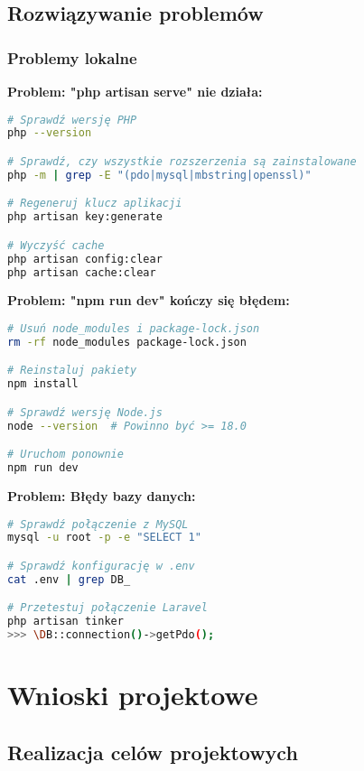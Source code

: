 \documentclass[12pt,a4paper]{article}
\begin{document}
    \subsection{Rozwiązywanie problemów}

    \subsubsection{Problemy lokalne}

    \textbf{Problem: "php artisan serve" nie działa:}
    \begin{lstlisting}[language=bash]
# Sprawdź wersję PHP
php --version

# Sprawdź, czy wszystkie rozszerzenia są zainstalowane
php -m | grep -E "(pdo|mysql|mbstring|openssl)"

# Regeneruj klucz aplikacji
php artisan key:generate

# Wyczyść cache
php artisan config:clear
php artisan cache:clear
    \end{lstlisting}

    \textbf{Problem: "npm run dev" kończy się błędem:}
    \begin{lstlisting}[language=bash]
# Usuń node_modules i package-lock.json
rm -rf node_modules package-lock.json

# Reinstaluj pakiety
npm install

# Sprawdź wersję Node.js
node --version  # Powinno być >= 18.0

# Uruchom ponownie
npm run dev
    \end{lstlisting}

    \textbf{Problem: Błędy bazy danych:}
    \begin{lstlisting}[language=bash]
# Sprawdź połączenie z MySQL
mysql -u root -p -e "SELECT 1"

# Sprawdź konfigurację w .env
cat .env | grep DB_

# Przetestuj połączenie Laravel
php artisan tinker
>>> \DB::connection()->getPdo();
    \end{lstlisting}

    \section{Wnioski projektowe}

    \subsection{Realizacja celów projektowych}
\end{document}
